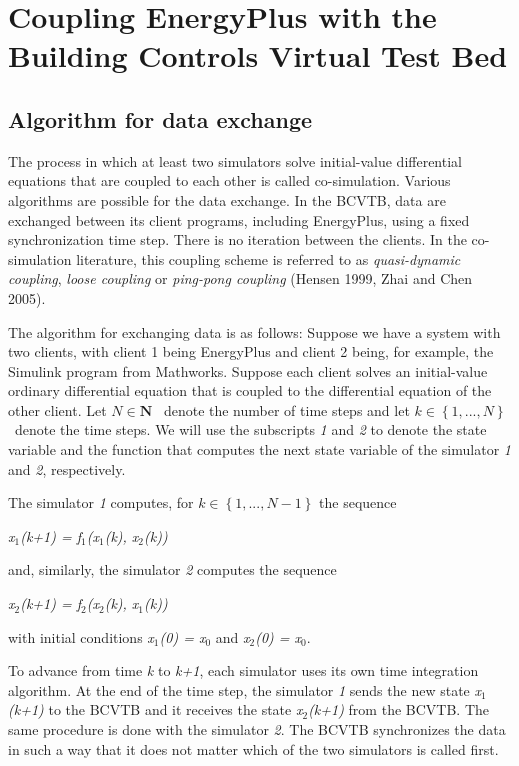 \section{Coupling EnergyPlus with the Building Controls Virtual Test Bed}\label{coupling-energyplus-with-the-building-controls-virtual-test-bed}

\subsection{Algorithm for data exchange}\label{algorithm-for-data-exchange}

The process in which at least two simulators solve initial-value differential equations that are coupled to each other is called co-simulation. Various algorithms are possible for the data exchange. In the BCVTB, data are exchanged between its client programs, including EnergyPlus, using a fixed synchronization time step. There is no iteration between the clients. In the co-simulation literature, this coupling scheme is referred to as \emph{quasi-dynamic coupling}, \emph{loose coupling} or \emph{ping-pong coupling} (Hensen 1999, Zhai and Chen 2005).

The algorithm for exchanging data is as follows: Suppose we have a system with two clients, with client 1 being EnergyPlus and client 2 being, for example, the Simulink program from Mathworks. Suppose each client solves an initial-value ordinary differential equation that is coupled to the differential equation of the other client. Let \(N\in\mathbf{N}\) ~denote the number of time steps and let \(k\in\left\{1,...,N\right\}\) ~denote the time steps. We will use the subscripts \emph{1} and \emph{2} to denote the state variable and the function that computes the next state variable of the simulator \emph{1} and \emph{2}, respectively.

The simulator \emph{1} computes, for \(k\in\left\{1,...,N-1\right\}\) the sequence

\emph{x\(_{1}\)(k+1) = f\(_{1}\)(x\(_{1}\)(k), x\(_{2}\)(k))}

and, similarly, the simulator \emph{2} computes the sequence

\emph{x\(_{2}\)(k+1) = f\(_{2}\)(x\(_{2}\)(k), x\(_{1}\)(k))}

with initial conditions \emph{x\(_{1}\)(0) = x\(_{0}\)} and \emph{x\(_{2}\)(0) = x\(_{0}\)}.

To advance from time \emph{k} to \emph{k+1}, each simulator uses its own time integration algorithm. At the end of the time step, the simulator \emph{1} sends the new state \emph{x\(_{1}\)(k+1)} to the BCVTB and it receives the state \emph{x\(_{2}\)(k+1)} from the BCVTB. The same procedure is done with the simulator \emph{2}. The BCVTB synchronizes the data in such a way that it does not matter which of the two simulators is called first.

